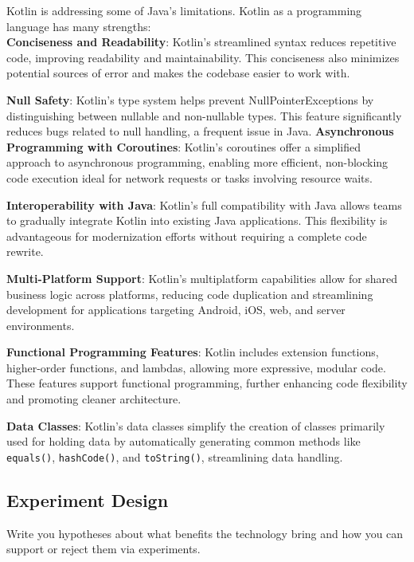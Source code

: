 \vspace{1cm}

Kotlin is addressing some of Java's limitations. Kotlin as a programming language has many strengths:
\\
\textbf{Conciseness and Readability}: Kotlin’s streamlined syntax reduces repetitive code, improving readability and maintainability. This conciseness also minimizes potential sources of error and makes the codebase easier to work with.

\textbf{Null Safety}: Kotlin’s type system helps prevent NullPointerExceptions by distinguishing between nullable and non-nullable types. This feature significantly reduces bugs related to null handling, a frequent issue in Java.
\textbf{Asynchronous Programming with Coroutines}: Kotlin’s coroutines offer a simplified approach to asynchronous programming, enabling more efficient, non-blocking code execution ideal for network requests or tasks involving resource waits.

\textbf{Interoperability with Java}: Kotlin’s full compatibility with Java allows teams to gradually integrate Kotlin into existing Java applications. This flexibility is advantageous for modernization efforts without requiring a complete code rewrite.

\textbf{Multi-Platform Support}: Kotlin’s multiplatform capabilities allow for shared business logic across platforms, reducing code duplication and streamlining development for applications targeting Android, iOS, web, and server environments.

\textbf{Functional Programming Features}: Kotlin includes extension functions, higher-order functions, and lambdas, allowing more expressive, modular code. These features support functional programming, further enhancing code flexibility and promoting cleaner architecture.

\textbf{Data Classes}: Kotlin’s data classes simplify the creation of classes primarily used for holding data by automatically generating common methods like \texttt{equals()}, \texttt{hashCode()}, and \texttt{toString()}, streamlining data handling.


\subsection{Experiment Design}

Write you hypotheses about what benefits the technology bring and how you can support or reject them via experiments.

